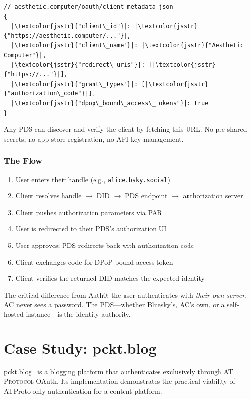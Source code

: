 \documentclass[10pt,letterpaper,twocolumn]{article}
\newcommand{\atproto}{\textsc{AT Protocol}}
\begin{document}
\begin{lstlisting}[style=acjsstyle]
// aesthetic.computer/oauth/client-metadata.json
{
  |\textcolor{jsstr}{"client\_id"}|: |\textcolor{jsstr}{"https://aesthetic.computer/..."}|,
  |\textcolor{jsstr}{"client\_name"}|: |\textcolor{jsstr}{"Aesthetic Computer"}|,
  |\textcolor{jsstr}{"redirect\_uris"}|: [|\textcolor{jsstr}{"https://..."}|],
  |\textcolor{jsstr}{"grant\_types"}|: [|\textcolor{jsstr}{"authorization\_code"}|],
  |\textcolor{jsstr}{"dpop\_bound\_access\_tokens"}|: true
}
\end{lstlisting}

Any PDS can discover and verify the client by fetching this URL. No pre-shared secrets, no app store registration, no API key management.

\subsubsection{The Flow}

\begin{enumerate}
  \item User enters their handle (e.g., \texttt{alice.bsky.social})
  \item Client resolves handle $\to$ DID $\to$ PDS endpoint $\to$ authorization server
  \item Client pushes authorization parameters via PAR
  \item User is redirected to their PDS's authorization UI
  \item User approves; PDS redirects back with authorization code
  \item Client exchanges code for DPoP-bound access token
  \item Client verifies the returned DID matches the expected identity
\end{enumerate}

The critical difference from Auth0: the user authenticates with \emph{their own server}. AC never sees a password. The PDS---whether Bluesky's, AC's own, or a self-hosted instance---is the identity authority.


\section{Case Study: pckt.blog}
\label{sec:pckt}

pckt.blog~\citep{pcktblog2025} is a blogging platform that authenticates exclusively through \atproto{} OAuth. Its implementation demonstrates the practical viability of ATProto-only authentication for a content platform.
\end{document}

